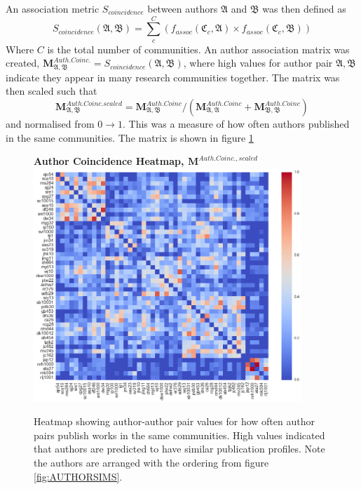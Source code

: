 An association metric $S_{coincidence}$ between authors $\mathfrak{A}$ and $\mathfrak{B}$ was then defined as $$S_{coincidence}\left( \mathfrak{A} , \mathfrak{B} \right) = \sum_c^C \left(f_{assoc} \left( \mathfrak{C}_c , \mathfrak{A} \right)\times f_{assoc}\left( \mathfrak{C}_c , \mathfrak{B} \right) \right) $$
Where $C$ is the total number of communities. An author association matrix was created, $\mathbf{M}^{Auth. Coinc.}_{\mathfrak{A} , \mathfrak{B}} = S_{coincidence}\left( \mathfrak{A} , \mathfrak{B} \right)$, where high values for author pair $\mathfrak{A} , \mathfrak{B}$ indicate they appear in many research communities together. The matrix was then scaled such that 
$$\mathbf{M}^{Auth. Coinc.scaled}_{\mathfrak{A} , \mathfrak{B}} =  \mathbf{M}^{Auth. Coinc}_{\mathfrak{A} , \mathfrak{B}} /  \left( \mathbf{M}^{Auth. Coinc}_{\mathfrak{A} , \mathfrak{A}} + \mathbf{M}^{Auth. Coinc}_{\mathfrak{B} , \mathfrak{B}} \right) $$
and normalised from $0 \rightarrow 1$. This was a measure of how often authors published in the same communities. The matrix is shown in figure \ref{fig:commHEATMAP}
\newpage
\begin{center}
\begin{figure}[H]
  \centering
  \textbf{Author Coincidence Heatmap, $\mathbf{M}^{Auth. Coinc.,scaled}$}
    \includegraphics[width=0.9\textwidth]{Analysis/author_comm_heatmap.png}
    \caption[Author Coincidence Matrix Heatmap]{Heatmap showing author-author pair values for how often author pairs publish works in the same communities. High values indicated that authors are predicted to have similar publication profiles. Note the authors are arranged with the ordering from figure \ref{fig:AUTHORSIMS}.}
    \label{fig:commHEATMAP}
\end{figure} 
\end{center}
